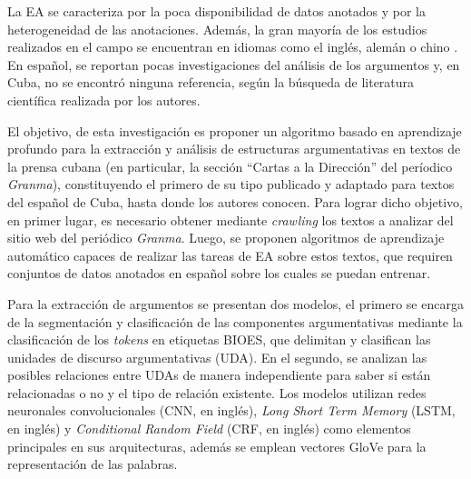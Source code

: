 \documentclass[a4paper,11pt,twocolumn,twoside]{article}
\begin{document}
La EA se caracteriza por la poca disponibilidad de datos anotados y 
por la heterogeneidad de las 
anotaciones. Además, la gran mayoría de los estudios realizados en el campo se encuentran en 
idiomas como el inglés, alemán o chino \cite{eger2018cross}. 
En español, se reportan pocas investigaciones del análisis de los argumentos \cite{esteve2020mineria} y, en 
Cuba, no se encontró ninguna referencia, según la búsqueda de literatura científica
realizada por los autores.



El objetivo, de esta investigación es proponer un algoritmo basado en aprendizaje profundo 
para la extracción y análisis de estructuras argumentativas en textos 
de la prensa cubana (en particular, la sección ``Cartas a la Dirección'' del períodico \textit{Granma}), 
constituyendo el primero de su tipo publicado y adaptado para
textos del español de Cuba, hasta donde los autores conocen. 
Para lograr dicho objetivo, en primer lugar, es necesario obtener mediante \textit{crawling} los textos a analizar del sitio 
web del periódico \textit{Granma}. Luego, se proponen algoritmos de aprendizaje automático capaces de realizar las tareas 
de EA sobre estos textos, que requiren conjuntos 
de datos anotados en español sobre los cuales se puedan entrenar.

Para la extracción
de argumentos se presentan dos modelos, el primero se encarga de la segmentación y clasificación
de las componentes argumentativas mediante la clasificación de los \textit{tokens} en etiquetas BIOES, que %
delimitan y clasifican las unidades de discurso argumentativas (UDA). En el segundo, se analizan 
las posibles relaciones entre UDAs de manera independiente para saber si están relacionadas o no y
el tipo de relación existente. Los modelos utilizan 
redes neuronales convolucionales (CNN, en inglés), \textit{Long Short Term Memory} (LSTM, en inglés) \cite{hochreiter1997long} y \textit{Conditional Random Field} (CRF, en inglés) \cite{lafferty2001conditional}
como elementos principales en sus arquitecturas, además se emplean vectores GloVe \cite{pennington2014glove} para la representación
de las palabras. 
\end{document}
